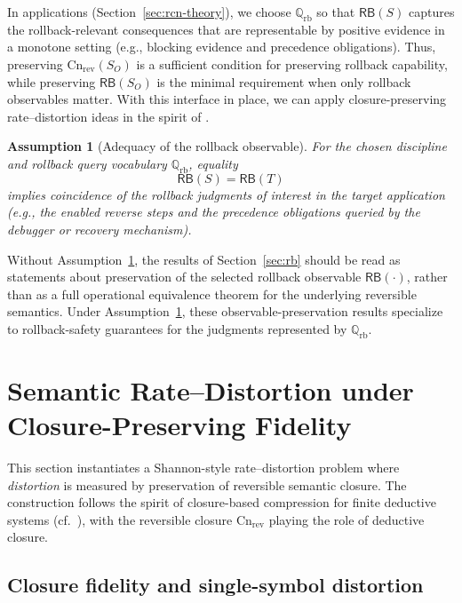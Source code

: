 \documentclass[twoside]{article}
\newtheorem{assumption}[theorem]{Assumption}
\newcommand{\Cn}{\mathrm{Cn}}
\newcommand{\1}{\mathbf{1}}
\begin{document}
In applications (Section~\ref{sec:rcn-theory}), we choose \(\mathbb{Q}_{\mathrm{rb}}\) so that \(\mathsf{RB}(S)\)
captures the rollback-relevant consequences that are representable by positive evidence in a monotone setting
(e.g., blocking evidence and precedence obligations).
Thus, preserving \(\Cn_{\mathrm{rev}}(S_O)\) is a sufficient condition for preserving rollback capability,
while preserving \(\mathsf{RB}(S_O)\) is the minimal requirement when only rollback observables matter.
With this interface in place, we can apply closure-preserving rate--distortion ideas in the spirit of \cite{xu2026rate}.

\begin{assumption}[Adequacy of the rollback observable]
\label{assm:rb-adequacy}
For the chosen discipline and rollback query vocabulary \(\mathbb{Q}_{\mathrm{rb}}\), equality
\[
\mathsf{RB}(S)=\mathsf{RB}(T)
\]
implies coincidence of the rollback judgments of interest in the target application
(e.g., the enabled reverse steps and the precedence obligations queried by the debugger or recovery mechanism).
\end{assumption}

Without Assumption~\ref{assm:rb-adequacy}, the results of Section~\ref{sec:rb} should be read as statements about
preservation of the selected rollback observable \(\mathsf{RB}(\cdot)\), rather than as a full operational equivalence theorem
for the underlying reversible semantics.
Under Assumption~\ref{assm:rb-adequacy}, these observable-preservation results specialize to rollback-safety guarantees
for the judgments represented by \(\mathbb{Q}_{\mathrm{rb}}\).

\section{Semantic Rate--Distortion under Closure-Preserving Fidelity}
\label{sec:zero}

This section instantiates a Shannon-style rate--distortion problem where \emph{distortion} is measured by preservation of reversible semantic closure.
The construction follows the spirit of closure-based compression for finite deductive systems (cf.\ \cite{xu2026rate}),
with the reversible closure \(\Cn_{\mathrm{rev}}\) playing the role of deductive closure.

\subsection{Closure fidelity and single-symbol distortion}
\label{sec:distortion}
\end{document}

